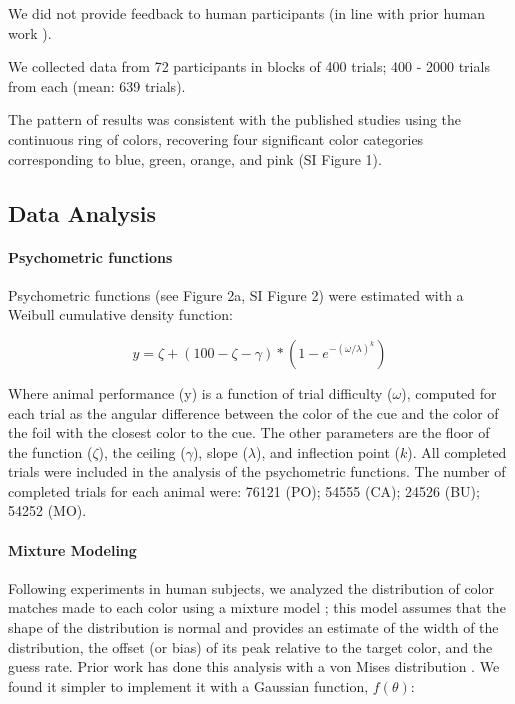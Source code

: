\documentclass[9pt,biorxiv,lineno,onehalfspacing]{lapreprint}
\begin{document}
\begin{refsection}
We did not provide feedback to human participants (in line with prior human work \citep{bae_why_2015,panichello_error-correcting_2019}). 

We collected data from 72 participants in blocks of 400 trials; 400 - 2000 trials from each (mean: 639 trials).

The pattern of results was consistent with the published studies using the continuous ring of colors, recovering four significant color categories corresponding to blue, green, orange, and pink (SI Figure 1). 

\subsection{Data Analysis}

\paragraph{Psychometric functions}

Psychometric functions (see Figure 2a, SI Figure 2) were estimated with a Weibull cumulative density function: %

\begin{equation} \label{eq:Weibull}
    y=\zeta+(100-\zeta-\gamma) *\left(1-e^{-(\omega / \lambda)^k}\right) 
\end{equation}

Where animal performance (y) is a function of trial difficulty ($\omega$), computed for each trial as the angular difference between the color of the cue and the color of the foil with the closest color to the cue. 
The other parameters are the floor of the function ($\zeta$), the ceiling ($\gamma$), slope ($\lambda$), and inflection point ($k$). 
All completed trials were included in the analysis of the psychometric functions. 
The number of completed trials for each animal were: 76121 (PO); 54555 (CA); 24526 (BU); 54252 (MO). 

\paragraph{Mixture Modeling}\label{para:MixtureModeling}

Following experiments in human subjects, we analyzed the distribution of color matches made to each color using a mixture model \citep{zhang_discrete_2008,bae_why_2015}; this model assumes that the shape of the distribution is normal and provides an estimate of the width of the distribution, the offset (or bias) of its peak relative to the target color, and the guess rate.
Prior work has done this analysis with a von Mises distribution \citep{zhang_discrete_2008,bae_why_2015}.
We found it simpler to implement it with a Gaussian function, $f(\theta)$:


\end{refsection}
\end{document}
